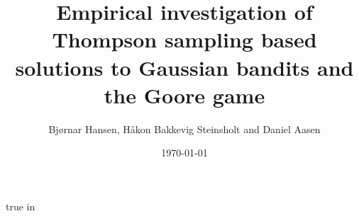 \documentclass[12pt,a4paper,final]{report}
\author{Bjørnar Hansen, Håkon Bakkevig Steinsholt and Daniel Aasen}
\title{Empirical investigation of Thompson sampling based solutions to Gaussian bandits and the Goore game}
\date{\today} %
\theoremstyle{definition}
\begin{document}
    \maketitle

    \newpage    
    
%   

    \tableofcontents
    \listoffigures
    \listoftables

     true in

    \newpage

        
                
    
    
    

    \begin{singlespace}
        
        
    \end{singlespace}

    \printglossary
\end{document}
